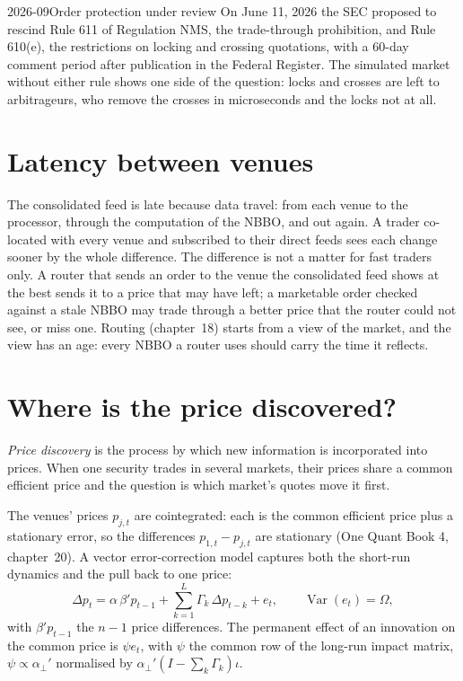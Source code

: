 \begin{dated}{2026-09}{Order protection under review}\label{dat:mx:fragmentation-and-routing:opr}
On June 11, 2026 the SEC proposed to rescind Rule 611 of Regulation NMS, the trade-through prohibition, and Rule 610(e), the restrictions on locking and
crossing quotations, with a 60-day comment period after publication in the Federal Register. The simulated market without either rule shows one side of
the question: locks and crosses are left to arbitrageurs, who remove the crosses in microseconds and the locks not at all.
\end{dated}

\section{Latency between venues}

The consolidated feed is late because data travel: from each venue to the processor, through the computation of the NBBO, and out again. A trader
co-located with every venue and subscribed to their direct feeds sees each change sooner by the whole difference. The difference is not a matter for
fast traders only. A router that sends an order to the venue the consolidated feed shows at the best sends it to a price that may have left; a
marketable order checked against a stale NBBO may trade through a better price that the router could not see, or miss one. Routing (chapter~18)
starts from a view of the market, and the view has an age: every NBBO a router uses should carry the time it reflects.

\section{Where is the price discovered?}

\begin{definition}\label{def:mx:fragmentation-and-routing:discovery}
\emph{Price discovery} is the process by which new information is incorporated into prices. When one security trades in several
markets, their prices share a common efficient price and the question is which market's quotes move it first.
\end{definition}

The venues' prices $p_{j,t}$ are cointegrated: each is the common efficient price plus a stationary error, so the differences $p_{1,t}-p_{j,t}$ are
stationary (One Quant Book 4, chapter~20). A vector error-correction model captures both the short-run dynamics and the pull back to one price:
\[
\Delta p_t=\alpha\,\beta' p_{t-1}+\sum_{k=1}^{L}\Gamma_k\,\Delta p_{t-k}+e_t,\qquad \operatorname{Var}(e_t)=\Omega,
\]
with $\beta'p_{t-1}$ the $n-1$ price differences. The permanent effect of an innovation on the common price is $\psi e_t$, with $\psi$ the common row of
the long-run impact matrix, $\psi\propto\alpha_\perp'$ normalised by $\alpha_\perp'(I-\sum_k\Gamma_k)\iota$.

